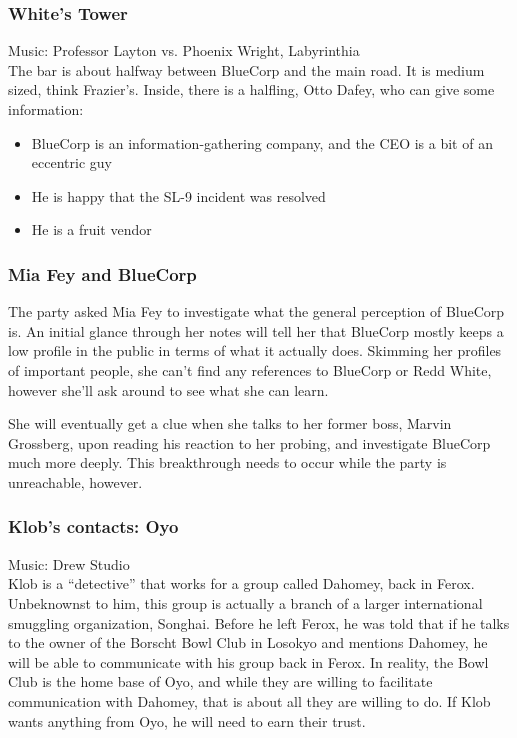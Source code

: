 \subsubsection{White's Tower}
Music: Professor Layton vs. Phoenix Wright, Labyrinthia\\
The bar is about halfway between BlueCorp and the main road. It is medium sized, think Frazier's. Inside, there is a halfling, Otto Dafey, who can give some information:
\begin{itemize}
\item BlueCorp is an information-gathering company, and the CEO is a bit of an eccentric guy
\item He is happy that the SL-9 incident was resolved
\item He is a fruit vendor
\end{itemize}

\subsubsection{Mia Fey and BlueCorp}
The party asked Mia Fey to investigate what the general perception of BlueCorp is. An initial glance through her notes will tell her that BlueCorp mostly keeps a low profile in the public in terms of what it actually does. Skimming her profiles of important people, she can't find any references to BlueCorp or Redd White, however she'll ask around to see what she can learn.

She will eventually get a clue when she talks to her former boss, Marvin Grossberg, upon reading his reaction to her probing, and investigate BlueCorp much more deeply. This breakthrough needs to occur while the party is unreachable, however.

\subsubsection{Klob's contacts: Oyo}
Music: Drew Studio\\
Klob is a ``detective'' that works for a group called Dahomey, back in Ferox. Unbeknownst to him, this group is actually a branch of a larger international smuggling organization, Songhai. Before he left Ferox, he was told that if he talks to the owner of the Borscht Bowl Club in Losokyo and mentions Dahomey, he will be able to communicate with his group back in Ferox. In reality, the Bowl Club is the home base of Oyo, and while they are willing to facilitate communication with Dahomey, that is about all they are willing to do. If Klob wants anything from Oyo, he will need to earn their trust.


